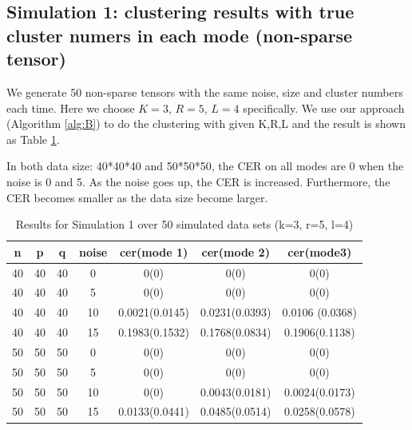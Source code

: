\documentclass{article}
\begin{document}
\subsection{Simulation 1: clustering results with true cluster numers in each mode (non-sparse tensor)}
We generate 50 non-sparse tensors with the same noise, size and cluster numbers each time. Here we choose $K=3$, $R=5$, $L=4$ specifically. We use our approach (Algorithm \ref{alg:B}) to do the clustering with given K,R,L and the result is shown as Table \ref{t1}.\par 
In both data size: 40*40*40 and 50*50*50, the CER on all modes are 0 when the noise is 0 and 5. As the noise goes up, the CER is increased. Furthermore, the CER becomes smaller as the data size become larger.
\begin{table}
	\centering
	\begin{tabular}{|c|c|c|c|c|c|c|}
		\hline
		n&p&q&noise&cer(mode 1)&cer(mode 2)&cer(mode3)\\ \hline
		40&40&40&0&0(0)&0(0)&0(0) \\
		40&40&40&5&0(0)&0(0)&0(0) \\
		40&40&40&10&0.0021(0.0145)&0.0231(0.0393)&0.0106 (0.0368)\\
		40&40&40&15&0.1983(0.1532)&0.1768(0.0834)&0.1906(0.1138) \\
		50&50&50&0&0(0)&0(0)&0(0) \\
		50&50&50&5&0(0)&0(0)&0(0) \\
		50&50&50&10&0(0)&0.0043(0.0181)&0.0024(0.0173) \\
		50&50&50&15&0.0133(0.0441)&0.0485(0.0514)&0.0258(0.0578) \\
		\hline
	\end{tabular}
	\caption{Results for Simulation 1 over 50 simulated data sets (k=3, r=5, l=4)}
	\label{t1}
\end{table}
\end{document}
